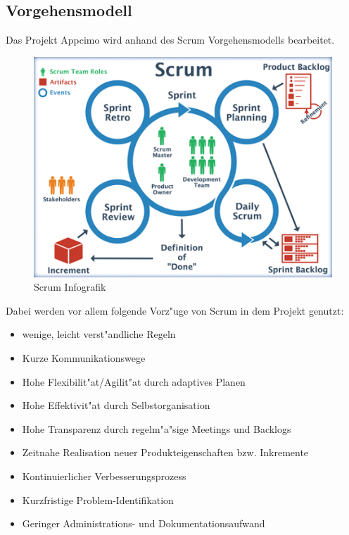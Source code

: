 \documentclass[a4paper, 11pt]{scrreprt}
\begin{document}
\subsection{Vorgehensmodell}
Das Projekt Appcimo wird anhand des Scrum Vorgehensmodells bearbeitet. 

\begin{figure} [H]
\begin{center}


\includegraphics[width=12cm]{Scrum.png}
\caption{Scrum Infografik}
\label{Scrum_logo}

\end{center}
\end{figure}

Dabei werden vor allem folgende Vorz"uge von Scrum in dem Projekt genutzt:

\begin{itemize}
\item{wenige, leicht verst"andliche Regeln}
\item{Kurze Kommunikationswege}
\item{Hohe Flexibilit"at/Agilit"at durch adaptives Planen}
\item{Hohe Effektivit"at durch Selbstorganisation}
\item{Hohe Transparenz durch regelm"a"sige Meetings und Backlogs}
\item{Zeitnahe Realisation neuer Produkteigenschaften bzw. Inkremente}
\item{Kontinuierlicher Verbesserungsprozess}
\item{Kurzfristige Problem-Identifikation}
\item{Geringer Administrations- und Dokumentationsaufwand}
\end{itemize}
\end{document}
